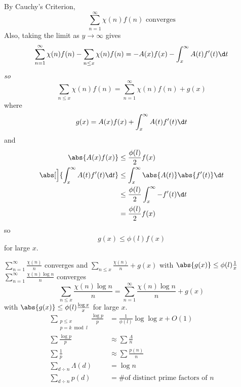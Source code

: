 By Cauchy's Criterion,
\[ \sum_{n=1}^\infty \chi(n)f(n) \text{ converges} \]
Also, taking the limit as $y\to\infty$ gives
\[ \sum_{n=1}^\infty \chi(n)f(n) -\sum_{n\leq x}\chi(n)f(n) = -A(x)f(x)-\int_x^\infty A(t)f'(t)\d t \]
\emph{so}
\[ \sum_{n\leq x}\chi(n)f(n) = \sum_{n=1}^\infty \chi(n)f(n) + g(x) \]
where
\[ g(x) = A(x)f(x) + \int_x^\infty A(t)f'(t)\d t \]
and
\begin{align*}
\abs{A(x)f(x)} &\leq \frac{\phi(l)}{2} f(x) \\
\abs[\Big]{\int_x^\infty A(t)f'(t)\d t} &\leq \int_x^\infty \abs{A(t)}\abs{f'(t)}\d t \\
&\leq \frac{\phi(l)}{2}\int_x^\infty -f'(t)\d t \\
&= \frac{\phi(l)}{2}f(x)
\end{align*}
so
\[ g(x) \leq \phi(l)f(x) \]
for large $x$.

\eg $\sum_{n=1}^\infty\frac{\chi(n)}{n}$ converges and $\sum_{n\leq x}\frac{\chi(n)}{n}+g(x)$ with $\abs{g(x)}\leq\phi(l)\frac1x$ \\
$\sum_{n=1}^\infty\frac{\chi(n)\log n}{n}$ converges
\[ \sum_{n\leq x}\frac{\chi(n)\log n}{n} = \sum_{n=1}^\infty \frac{\chi(n)\log n}{n} + g(x) \]
with $\abs{g(x)}\leq\phi(l)\frac{\log x}{x}$ for large $x$.
\begin{align*}
\sum_{\substack{p\leq x\\p=k\bmod l}}\frac{\log p}{p} &= \frac{1}{\phi(l)}\log\log x + O(1) \\
\sum\frac{\log p}{p} &\approx \sum\frac{\Lambda}{n} \\
\sum\frac1p &\approx \sum\frac{p(n)}{n} \\
\sum_{d\div n}\Lambda(d) &= \log n \\
\sum_{d\div n}p(d) &= \text{\# of distinct prime factors of $n$}
\end{align*}
